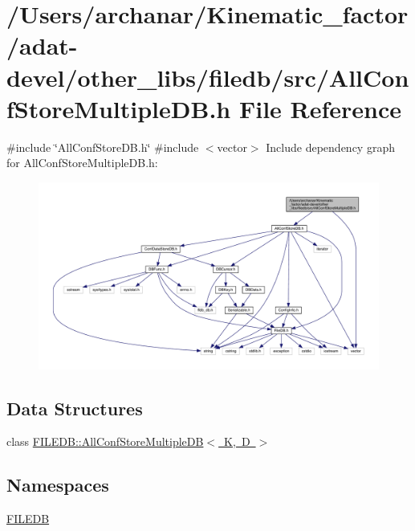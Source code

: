 \hypertarget{adat-devel_2other__libs_2filedb_2src_2AllConfStoreMultipleDB_8h}{}\section{/\+Users/archanar/\+Kinematic\+\_\+factor/adat-\/devel/other\+\_\+libs/filedb/src/\+All\+Conf\+Store\+Multiple\+DB.h File Reference}
\label{adat-devel_2other__libs_2filedb_2src_2AllConfStoreMultipleDB_8h}
{\ttfamily \#include \char`\"{}All\+Conf\+Store\+D\+B.\+h\char`\"{}}\newline
{\ttfamily \#include $<$vector$>$}\newline
Include dependency graph for All\+Conf\+Store\+Multiple\+D\+B.\+h\+:
\nopagebreak
\begin{figure}[H]
\begin{center}
\leavevmode
\includegraphics[width=350pt]{d8/dd1/adat-devel_2other__libs_2filedb_2src_2AllConfStoreMultipleDB_8h__incl}
\end{center}
\end{figure}
\subsection*{Data Structures}
\begin{DoxyCompactItemize}
\item 
class \mbox{\hyperlink{classFILEDB_1_1AllConfStoreMultipleDB}{F\+I\+L\+E\+D\+B\+::\+All\+Conf\+Store\+Multiple\+D\+B$<$ K, D $>$}}
\end{DoxyCompactItemize}
\subsection*{Namespaces}
\begin{DoxyCompactItemize}
\item 
 \mbox{\hyperlink{namespaceFILEDB}{F\+I\+L\+E\+DB}}
\end{DoxyCompactItemize}
